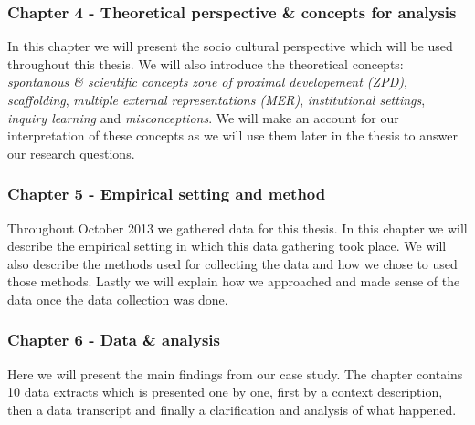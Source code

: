 \subsubsection*{Chapter 4 - Theoretical perspective \& concepts for analysis}

In this chapter we will present the socio cultural perspective which will be used throughout this thesis. We will also introduce the theoretical concepts: \emph{spontanous \& scientific concepts} \emph{zone of proximal developement (ZPD)}, \emph{scaffolding}, \emph{multiple external representations (MER)}, \emph{institutional settings}, \emph{inquiry learning} and \emph{misconceptions}. We will make an account for our interpretation of these concepts as we will use them later in the thesis to answer our research questions. 

\subsubsection*{Chapter 5 - Empirical setting and method}

Throughout October 2013 we gathered data for this thesis. In this chapter we will describe the empirical setting in which this data gathering took place. We will also describe the methods used for collecting the data and how we chose to used those methods. Lastly we will explain how we approached and made sense of the data once the data collection was done. 

\subsubsection*{Chapter 6 - Data \& analysis}
Here we will present the main findings from our case study. The chapter contains 10 data extracts which is presented one by one, first by a context description, then a data transcript and finally a clarification and analysis of what happened. 

